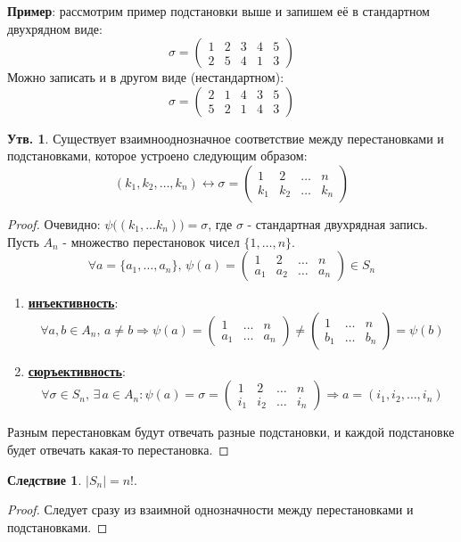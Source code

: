 \documentclass[12pt]{article}
\theoremstyle{definition}
\newtheorem{prop}{Утв.}
\newtheorem{corollary}{Следствие}
\begin{document}
\textbf{Пример}: рассмотрим пример подстановки выше и запишем её в стандартном двухрядном виде:
$$
	\sigma = \begin{pmatrix}
		1 & 2 & 3 & 4 & 5\\
		2 & 5 & 4 & 1 & 3
	\end{pmatrix}
$$
Можно записать и в другом виде (нестандартном):
$$
	\sigma = 
	\begin{pmatrix}
		2 & 1 & 4 & 3 & 5\\
		5 & 2 & 1 & 4 & 3
	\end{pmatrix}
$$
\begin{prop}
	Существует взаимнооднозначное соответствие между перестановками и подстановками, которое устроено следующим образом:
	$$
		(k_1, k_2, \dotsc, k_n) \leftrightarrow \sigma = 
		\begin{pmatrix}
			1 & 2 & \dotsc & n \\
			k_1 & k_2 & \dotsc & k_n
		\end{pmatrix}
	$$
\end{prop}
\begin{proof}
	Очевидно: $\psi\big((k_1, \dotsc k_n)\big) = \sigma$, где $\sigma$ - стандартная двухрядная запись. Пусть $A_n$ -  множество перестановок чисел $\{1,\dotsc,n\}$.
	$$
		\forall a =\{a_1,\dotsc, a_n\}, \, \psi(a) = 
		\begin{pmatrix}
			1 & 2 & \dotsc & n\\
			a_1 & a_2 & \dotsc & a_n
		\end{pmatrix} \in S_n
	$$
	\begin{enumerate}[label=\arabic*)]
		\item \textbf{\uline{инъективность}}: 
		$$
			\forall a,b \in A_n, \, a \neq b \Rightarrow \psi(a) = 
			\begin{pmatrix}
				1 & \dotsc & n\\
				a_1 & \dotsc & a_n 
			\end{pmatrix} \neq 
			\begin{pmatrix}
				1 & \dotsc & n\\
				b_1 & \dotsc & b_n
			\end{pmatrix} = \psi(b)
		$$
		\item \textbf{\uline{сюръективность}}:
		$$
			\forall \sigma \in S_n, \, \exists \, a \in A_n \colon \psi(a) = \sigma = 
			\begin{pmatrix}
				1 & 2 & \dotsc & n\\
				i_1 & i_2 & \dotsc & i_n
			\end{pmatrix} \Rightarrow  a = (i_1,i_2, \dotsc, i_n)
		$$
	\end{enumerate}
	Разным перестановкам будут отвечать разные подстановки, и каждой подстановке будет отвечать какая-то перестановка. 
\end{proof}
\begin{corollary}
	$|S_n| = n!$.
\end{corollary}
\begin{proof}
	Следует сразу из взаимной однозначности между перестановками и подстановками.
\end{proof}
\end{document}
